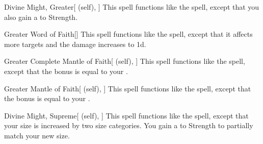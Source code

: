 \lowercase{\hypertarget{spell:Divine Might, Greater}{}}\label{spell:Divine Might, Greater}
\begin{attuneability}[\nth{5}]{\hypertarget{spell:Divine Might, Greater}{Divine Might, Greater}}[ (self), ]
This spell functions like the  spell, except that you also gain a   to Strength.
\end{attuneability}
\vspace{0.25em}



\lowercase{\hypertarget{spell:Greater Word of Faith}{}}\label{spell:Greater Word of Faith}
\begin{freeability}[\nth{5}]{\hypertarget{spell:Greater Word of Faith}{Greater Word of Faith}}[]
This spell functions like the  spell, except that it affects more targets and the damage increases to  \plus1d.
\end{freeability}
\vspace{0.25em}



\lowercase{\hypertarget{spell:Greater Complete Mantle of Faith}{}}\label{spell:Greater Complete Mantle of Faith}
\begin{attuneability}[\nth{6}]{\hypertarget{spell:Greater Complete Mantle of Faith}{Greater Complete Mantle of Faith}}[ (self), ]
This spell functions like the  spell, except that the bonus is equal to your .
\end{attuneability}
\vspace{0.25em}



\lowercase{\hypertarget{spell:Greater Mantle of Faith}{}}\label{spell:Greater Mantle of Faith}
\begin{attuneability}[\nth{6}]{\hypertarget{spell:Greater Mantle of Faith}{Greater Mantle of Faith}}[ (self), ]
This spell functions like the  spell, except that the bonus is equal to your .
\end{attuneability}
\vspace{0.25em}



\lowercase{\hypertarget{spell:Divine Might, Supreme}{}}\label{spell:Divine Might, Supreme}
\begin{attuneability}[\nth{7}]{\hypertarget{spell:Divine Might, Supreme}{Divine Might, Supreme}}[ (self), ]
This spell functions like the  spell, except that your size is increased by two size categories.
You gain a   to Strength to partially match your new size.
\end{attuneability}
\vspace{0.25em}



